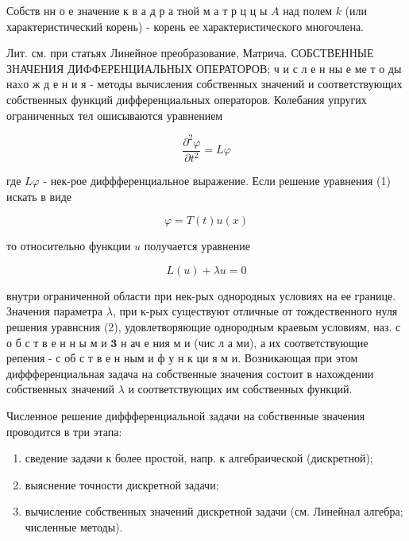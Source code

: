 \documentclass[10pt]{article}
\begin{document}
Собств нн о е значение к в а д р а тной м а т р ц ц ы $A$ над полем $k$ (или характеристический корень) - корень ее характеристического многочлена.



Лит. см. при статьях Линейное преобразование, Матрича. СОБСТВЕННЫЕ ЗНАЧЕНИЯ ДИФФЕРЕНЦИАЛЬНЫХ ОПЕРАТОРОВ; ч и с л е н ны е ме т о ды на$\mathrm{x} о$ ж д е н и я - методы вычисления собственных значений и соответствующих собственных функций дифференциальных операторов. Колебания упругих ограниченных тел ошисываются уравнением



\[

\frac{\partial^{2} \varphi}{\partial t^{2}}=L \varphi

\]



где $L \varphi$ - нек-рое диффференциальное выражение. Если решение уравнения (1) искать в виде



\[

\varphi=T(t) u(x)

\]



то относительно функции $u$ получается уравнение



\[

L(u)+\lambda u=0

\]



внутри ограниченной области при нек-рых однородных условиях на ее границе. Значения параметра $\lambda$, при к-рых существуют отличные от тождественного нуля решения уравнсния (2), удовлетворяющие однородным краевым условиям, наз. с о б с т в е н н ы м и $\mathbf{3}$ н ач е ния м и (чис л а ми), а их соответствующие репения - с об с т в е н ным и ф у н к ци я м и. Возникающая при этом диффференциальная задача на собственные значения состоит в нахождении собственных значений $\lambda$ и соответствующих им собственных функций.



Численное решение диффференциальной задачи на собственные значения проводится в три этапа:



\begin{enumerate}

  \item сведение задачи к более простой, напр. к алгебраической (дискретной);



  \item выяснение точности дискретной задачи;



  \item вычисление собственных значений дискретной задачи (см. Линейнал алгебра; численные методы).



\end{enumerate}
\end{document}
